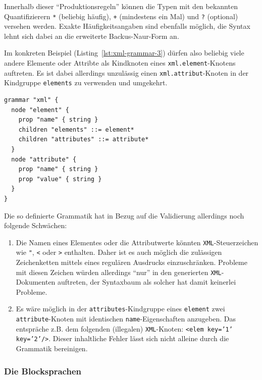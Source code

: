 \documentclass[paper=a4,fontsize=11pt,parskip=half]{scrartcl}
\begin{document}
Innerhalb dieser \enquote{Produktionsregeln} können die Typen mit den bekannten Quantifizierern \texttt{*} (beliebig häufig), \texttt{+} (mindestens ein Mal) und \texttt{?} (optional) versehen werden. Exakte Häufigkeitsangaben sind ebenfalls möglich, die Syntax lehnt sich dabei an die erweiterte Backus-Naur-Form an.

Im konkreten Beispiel (Listing~\ref{lst:xml-grammar-3}) dürfen also beliebig viele andere Elemente oder Attribte als Kindknoten eines \texttt{xml.element}-Knotens auftreten. Es ist dabei allerdings unzulässig einen \texttt{xml.attribut}-Knoten in der Kindgruppe \texttt{elements} zu verwenden und umgekehrt.

\begin{lstlisting}[float=h, label={lst:xml-grammar-3},caption={\texttt{XML} Schritt 3 - Beziehungen zwischen Elementen und Attributen},captionpos=b,language={Grammar}]
grammar "xml" {
  node "element" {
    prop "name" { string }
    children "elements" ::= element*
    children "attributes" ::= attribute*
  }
  node "attribute" {
    prop "name" { string }
    prop "value" { string }
  }
}
\end{lstlisting}

Die so definierte Grammatik hat in Bezug auf die Validierung allerdings noch folgende Schwächen:

\begin{enumerate}
\item Die Namen eines Elementes oder die Attributwerte könnten \texttt{XML}-Steuerzeichen wie \texttt{"}, \texttt{<} oder \texttt{>} enthalten. Daher ist es auch möglich die zulässigen Zeichenketten mittels eines regulären Ausdrucks einzuschränken. Probleme mit diesen Zeichen würden allerdings \enquote{nur} in den generierten \texttt{XML}-Dokumenten auftreten, der Syntaxbaum als solcher hat damit keinerlei Probleme.
\item Es wäre möglich in der \texttt{attributes}-Kindgruppe eines \texttt{element} zwei \texttt{attribute}-Knoten mit identischen \texttt{name}-Eigenschaften anzugeben. Das entspräche z.B. dem folgenden (illegalen) \texttt{XML}-Knoten: \texttt{<elem key='1' key='2'/>}. Dieser inhaltliche Fehler lässt sich nicht alleine durch die Grammatik bereinigen.
\end{enumerate}

\subsubsection{Die Blocksprachen}
\end{document}
